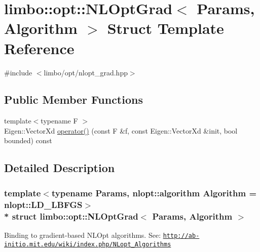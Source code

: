 \hypertarget{structlimbo_1_1opt_1_1_n_l_opt_grad}{}\section{limbo\+:\+:opt\+:\+:N\+L\+Opt\+Grad$<$ Params, Algorithm $>$ Struct Template Reference}
\label{structlimbo_1_1opt_1_1_n_l_opt_grad}


{\ttfamily \#include $<$limbo/opt/nlopt\+\_\+grad.\+hpp$>$}

\subsection*{Public Member Functions}
\begin{DoxyCompactItemize}
\item 
{\footnotesize template$<$typename F $>$ }\\Eigen\+::\+Vector\+Xd \hyperlink{structlimbo_1_1opt_1_1_n_l_opt_grad_a248805060cc986c4553d91f738b8b725}{operator()} (const F \&f, const Eigen\+::\+Vector\+Xd \&init, bool bounded) const 
\end{DoxyCompactItemize}


\subsection{Detailed Description}
\subsubsection*{template$<$typename Params, nlopt\+::algorithm Algorithm = nlopt\+::\+L\+D\+\_\+\+L\+B\+F\+GS$>$\\*
struct limbo\+::opt\+::\+N\+L\+Opt\+Grad$<$ Params, Algorithm $>$}

Binding to gradient-\/based N\+L\+Opt algorithms. See\+: \href{http://ab-initio.mit.edu/wiki/index.php/NLopt_Algorithms}{\tt http\+://ab-\/initio.\+mit.\+edu/wiki/index.\+php/\+N\+Lopt\+\_\+\+Algorithms}

